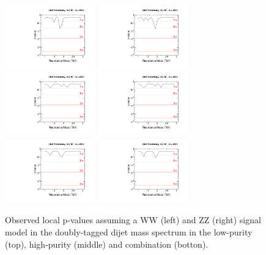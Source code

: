 \begin{figure}[h!tpb]
\begin{center}
\includegraphics[width=0.35\textwidth]{figs/limits/pvalue_BulkWW_low_purity.pdf}
\includegraphics[width=0.35\textwidth]{figs/limits/pvalue_BulkZZ_low_purity.pdf}\\
\includegraphics[width=0.35\textwidth]{figs/limits/pvalue_BulkWW_high_purity.pdf}
\includegraphics[width=0.35\textwidth]{figs/limits/pvalue_BulkZZ_high_purity.pdf}\\
\includegraphics[width=0.35\textwidth]{figs/limits/pvalue_BulkWW_combined.pdf}
\includegraphics[width=0.35\textwidth]{figs/limits/pvalue_BulkZZ_combined.pdf}
\end{center}
\caption{Observed local p-values assuming a \GBulk WW (left) and \GBulk ZZ (right) signal model in the doubly-tagged dijet mass spectrum in the low-purity (top), high-purity (middle) and combination (botton).}
\label{fig:Vtagresults52}
\end{figure}

